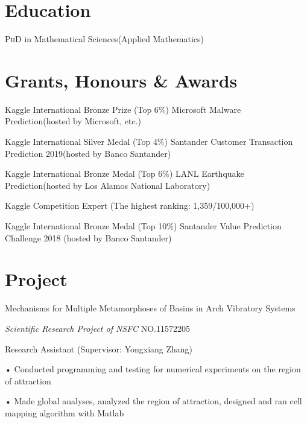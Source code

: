 \documentclass[11pt]{article}
\begin{document}
\section*{Education}
\textsc{PhD} in Mathematical Sciences(Applied Mathematics) 


\section*{Grants, Honours \& Awards}

Kaggle International Bronze Prize (Top 6\%) Microsoft Malware Prediction(hosted by Microsoft, etc.)

Kaggle International Silver Medal (Top 4\%) Santander Customer Transaction Prediction 2019(hosted by Banco Santander)

Kaggle International Bronze Medal (Top 6\%) LANL Earthquake Prediction(hosted by Los Alamos National Laboratory)

 Kaggle Competition Expert (The highest ranking: 1,359/100,000+)

 Kaggle International Bronze Medal (Top 10\%) Santander Value Prediction Challenge 2018 (hosted by Banco Santander)


\section*{Project}
Mechanisms for Multiple Metamorphoses of Basins in Arch Vibratory Systems 

\emph{Scientific Research Project of NSFC} \textsc{NO.11572205} 

Research Assistant (Supervisor: Yongxiang Zhang)

• Conducted programming and testing for numerical experiments on the region of attraction 

• Made global analyses, analyzed the region of attraction, designed and ran cell mapping algorithm with Matlab
\end{document}
